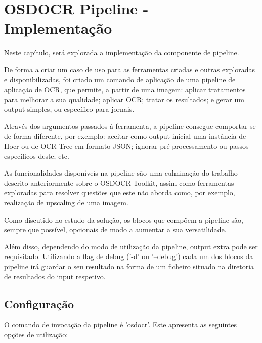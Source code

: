 \chapter{OSDOCR Pipeline - Implementação}
\label{cap_osdocr_pipeline_implementacao}

Neste capítulo, será explorada a implementação da componente de pipeline.

De forma a criar um caso de uso para as ferramentas criadas e outras exploradas e disponibilizadas, foi criado um comando de aplicação de uma pipeline de aplicação de OCR, que permite, a partir de uma imagem: aplicar tratamentos para melhorar a sua qualidade; aplicar OCR; tratar os resultados; e gerar um output simples, ou específico para jornais.

Através dos argumentos passados à ferramenta, a pipeline consegue comportar-se de forma diferente, por exemplo: aceitar como output inicial uma instância de Hocr ou de OCR Tree em formato JSON; ignorar pré-processamento ou passos específicos deste; etc.

As funcionalidades disponíveis na pipeline são uma culminação do trabalho descrito anteriormente sobre o OSDOCR Toolkit, assim como ferramentas exploradas para resolver questões que este não aborda como, por exemplo, realização de upscaling de uma imagem.

Como discutido no estudo da solução, os blocos que compõem a pipeline são, sempre que possível, opcionais de modo a aumentar a sua versatilidade.

Além disso, dependendo do modo de utilização da pipeline, output extra pode ser requisitado. Utilizando a flag de debug ('-d' ou '--debug') cada um dos blocos da pipeline irá guardar o seu resultado na forma de um ficheiro situado na diretoria de resultados do input respetivo. 

\section{Configuração}

O comando de invocação da pipeline é 'osdocr'. Este apresenta as seguintes opções de utilização:

